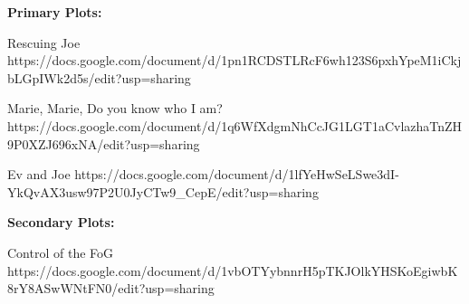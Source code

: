 \documentclass[char]{GL2020}
\begin{document}
\name{\cChupAvenger{}}








\textbf{Primary Plots:}
 
Rescuing Joe  https://docs.google.com/document/d/1pn1RCDSTLRcF6wh123S6pxhYpeM1iCkjbLGpIWk2d5s/edit?usp=sharing

Marie, Marie, Do you know who I am?  https://docs.google.com/document/d/1q6WfXdgmNhCcJG1LGT1aCvlazhaTnZH9P0XZJ696xNA/edit?usp=sharing

Ev and Joe  https://docs.google.com/document/d/1lfYeHwSeLSwe3dI-YkQvAX3usw97P2U0JyCTw9_CepE/edit?usp=sharing

\textbf{Secondary Plots:}

Control of the FoG https://docs.google.com/document/d/1vbOTYybnnrH5pTKJOlkYHSKoEgiwbK8rY8ASwWNtFN0/edit?usp=sharing
\end{document}
